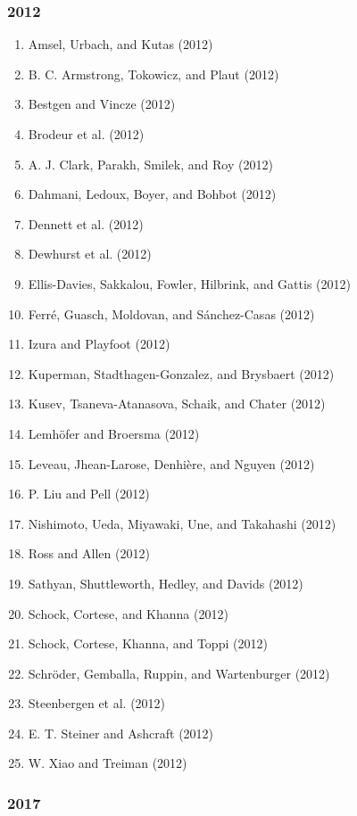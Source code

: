 \documentclass[english,man]{apa6}
\providecommand{\tightlist}{%
  \setlength{\itemsep}{0pt}\setlength{\parskip}{0pt}}
\theoremstyle{definition}
\theoremstyle{definition}
\theoremstyle{definition}
\theoremstyle{remark}
\begin{document}
\subsubsection{2012}\label{section-32}

\begin{enumerate}
\def\labelenumi{\arabic{enumi})}
\tightlist
\item
  Amsel, Urbach, and Kutas (2012)
\item
  B. C. Armstrong, Tokowicz, and Plaut (2012)
\item
  Bestgen and Vincze (2012)
\item
  Brodeur et al. (2012)
\item
  A. J. Clark, Parakh, Smilek, and Roy (2012)
\item
  Dahmani, Ledoux, Boyer, and Bohbot (2012)
\item
  Dennett et al. (2012)
\item
  Dewhurst et al. (2012)
\item
  Ellis-Davies, Sakkalou, Fowler, Hilbrink, and Gattis (2012)
\item
  Ferré, Guasch, Moldovan, and Sánchez-Casas (2012)
\item
  Izura and Playfoot (2012)
\item
  Kuperman, Stadthagen-Gonzalez, and Brysbaert (2012)
\item
  Kusev, Tsaneva-Atanasova, Schaik, and Chater (2012)
\item
  Lemhöfer and Broersma (2012)
\item
  Leveau, Jhean-Larose, Denhière, and Nguyen (2012)
\item
  P. Liu and Pell (2012)
\item
  Nishimoto, Ueda, Miyawaki, Une, and Takahashi (2012)
\item
  Ross and Allen (2012)
\item
  Sathyan, Shuttleworth, Hedley, and Davids (2012)
\item
  Schock, Cortese, and Khanna (2012)
\item
  Schock, Cortese, Khanna, and Toppi (2012)
\item
  Schröder, Gemballa, Ruppin, and Wartenburger (2012)
\item
  Steenbergen et al. (2012)
\item
  E. T. Steiner and Ashcraft (2012)
\item
  W. Xiao and Treiman (2012)
\end{enumerate}

\subsubsection{2017}\label{section-33}
\end{document}
